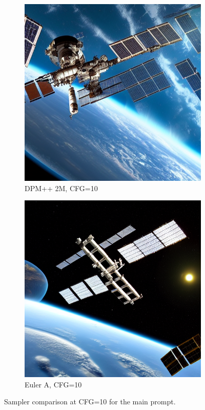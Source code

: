 \documentclass[10pt,twocolumn]{article}
\begin{document}
\begin{figure}[H]
\begin{subfigure}{0.32\textwidth}
        \includegraphics[width=\linewidth]{figures/baseline_dpm++_2m_cfg10.0_512_prompt10_20250712_114143.png}
        \caption{DPM++ 2M, CFG=10}
    \end{subfigure}
    \begin{subfigure}{0.32\textwidth}
        \includegraphics[width=\linewidth]{figures/baseline_euler_a_cfg10.0_512_prompt10_20250712_113814.png}
        \caption{Euler A, CFG=10}
    \end{subfigure}
    \caption{Sampler comparison at CFG=10 for the main prompt.}
\end{figure}
\end{document}

